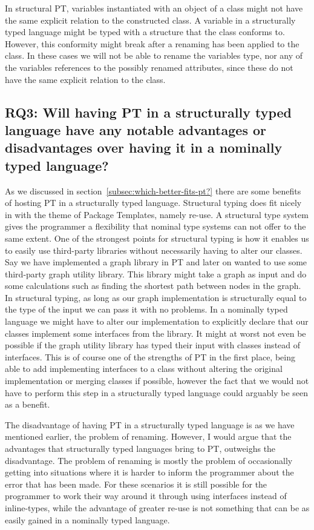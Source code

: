 In structural PT, variables instantiated with an object of a class might not have the same explicit relation to the constructed class.
A variable in a structurally typed language might be typed with a structure that the class conforms to.
However, this conformity might break after a renaming has been applied to the class.
In these cases we will not be able to rename the variables type, nor any of the variables references to the possibly renamed attributes, since these do not have the same explicit relation to the class.

\subsection*{RQ3: Will having PT in a structurally typed language have any notable advantages or disadvantages over having it in a nominally typed language?}

As we discussed in section~\vref{subsec:which-better-fits-pt?} there are some benefits of hosting PT in a structurally typed language.
Structural typing does fit nicely in with the theme of Package Templates, namely re-use.
A structural type system gives the programmer a flexibility that nominal type systems can not offer to the same extent.
One of the strongest points for structural typing is how it enables us to easily use third-party libraries without necessarily having to alter our classes.
Say we have implemented a graph library in PT and later on wanted to use some third-party graph utility library.
This library might take a graph as input and do some calculations such as finding the shortest path between nodes in the graph.
In structural typing, as long as our graph implementation is structurally equal to the type of the input we can pass it with no problems.
In a nominally typed language we might have to alter our implementation to explicitly declare that our classes implement some interfaces from the library.
It might at worst not even be possible if the graph utility library has typed their input with classes instead of interfaces.
This is of course one of the strengths of PT in the first place, being able to add implementing interfaces to a class without altering the original implementation or merging classes if possible, however the fact that we would not have to perform this step in a structurally typed language could arguably be seen as a benefit.

The disadvantage of having PT in a structurally typed language is as we have mentioned earlier, the problem of renaming.
However, I would argue that the advantages that structurally typed languages bring to PT, outweighs the disadvantage.
The problem of renaming is mostly the problem of occasionally getting into situations where it is harder to inform the programmer about the error that has been made.
For these scenarios it is still possible for the programmer to work their way around it through using interfaces instead of inline-types, while the advantage of greater re-use is not something that can be as easily gained in a nominally typed language.

